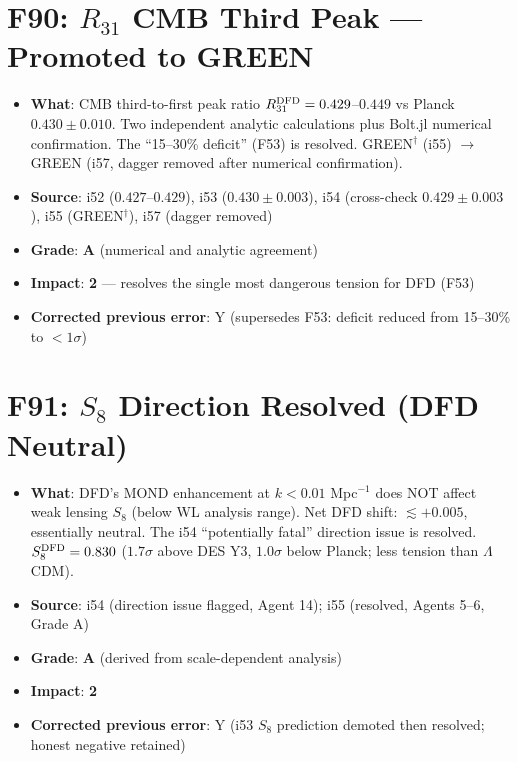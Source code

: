 \documentclass[11pt,a4paper]{article}
\newcommand{\grade}[1]{\textbf{#1}}
\newcommand{\impact}[1]{\textbf{#1}}
\begin{document}
\section{F90: $R_{31}$ CMB Third Peak --- Promoted to GREEN}
\begin{itemize}[nosep]
\item \textbf{What}: CMB third-to-first peak ratio $R_{31}^{\rm DFD} = 0.429$--$0.449$ vs Planck $0.430 \pm 0.010$. Two independent analytic calculations plus Bolt.jl numerical confirmation. The ``15--30\% deficit'' (F53) is resolved. GREEN$^\dagger$ (i55) $\to$ GREEN (i57, dagger removed after numerical confirmation).
\item \textbf{Source}: i52 ($0.427$--$0.429$), i53 ($0.430 \pm 0.003$), i54 (cross-check $0.429 \pm 0.003$), i55 (GREEN$^\dagger$), i57 (dagger removed)
\item \textbf{Grade}: \grade{A} (numerical and analytic agreement)
\item \textbf{Impact}: \impact{2} --- resolves the single most dangerous tension for DFD (F53)
\item \textbf{Corrected previous error}: Y (supersedes F53: deficit reduced from 15--30\% to $< 1\sigma$)
\end{itemize}

\section{F91: $S_8$ Direction Resolved (DFD Neutral)}
\begin{itemize}[nosep]
\item \textbf{What}: DFD's MOND enhancement at $k < 0.01$ Mpc$^{-1}$ does NOT affect weak lensing $S_8$ (below WL analysis range). Net DFD shift: $\lesssim +0.005$, essentially neutral. The i54 ``potentially fatal'' direction issue is resolved. $S_8^{\rm DFD} = 0.830$ ($1.7\sigma$ above DES Y3, $1.0\sigma$ below Planck; less tension than $\Lambda$CDM).
\item \textbf{Source}: i54 (direction issue flagged, Agent 14); i55 (resolved, Agents 5--6, Grade A)
\item \textbf{Grade}: \grade{A} (derived from scale-dependent analysis)
\item \textbf{Impact}: \impact{2}
\item \textbf{Corrected previous error}: Y (i53 $S_8$ prediction demoted then resolved; honest negative retained)
\end{itemize}
\end{document}
